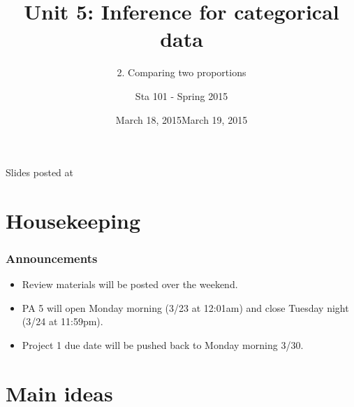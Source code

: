 \documentclass[slidestop,compress,mathserif,12pt,t,professionalfonts,xcolor=table]{beamer}
\title{Unit 5: Inference for categorical data}
\subtitle{2. Comparing two proportions}
\author{Sta 101 - Spring 2015}
\date{March 18, 2015}
\date{March 19, 2015}
\institute{Duke University, Department of Statistical Science}
\begin{document}


\begin{frame}[plain]

\titlepage
\vfill
{\scriptsize {} \hfill Slides posted at  \webLink{\CourseSite}{\CourseSite}}
\addtocounter{framenumber}{-1} 

\end{frame}


\section{Housekeeping}


\begin{frame}
\frametitle{Announcements}

\begin{itemize}






\item Review materials will be posted over the weekend.

\item PA 5 will open Monday morning (3/23 at 12:01am) and close Tuesday night (3/24 at 11:59pm).

\item Project 1 due date will be pushed back to Monday morning 3/30.

\end{itemize}

\end{frame}


\section{Main ideas}
\end{document}

